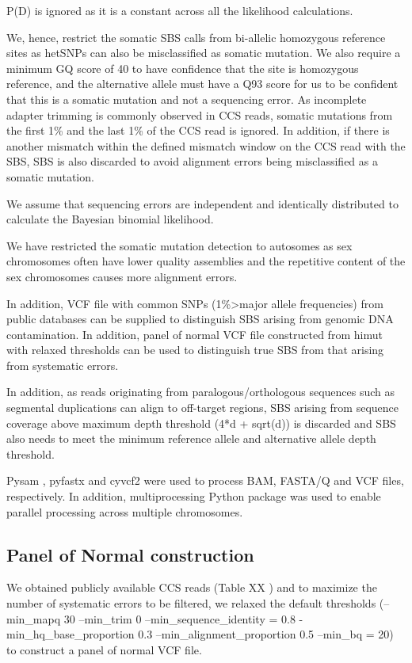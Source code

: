 P(D) is ignored as it is a constant across all the likelihood calculations. 

We, hence, restrict the somatic SBS calls from bi-allelic homozygous reference sites as hetSNPs can also be misclassified as somatic mutation. We also require a minimum GQ score of 40 to have confidence that the site is homozygous reference, and the alternative allele must have a Q93 score for us to be confident that this is a somatic mutation and not a sequencing error. As incomplete adapter trimming is commonly observed in CCS reads, somatic mutations from the first 1\% and the last 1\% of the CCS read is ignored. In addition, if there is another mismatch within the defined mismatch window on the CCS read with the SBS, SBS is also discarded to avoid alignment errors being misclassified as a somatic mutation. 

We assume that sequencing errors are independent and identically distributed to calculate the Bayesian binomial likelihood. 

We have restricted the somatic mutation detection to autosomes as sex chromosomes often have lower quality assemblies and the repetitive content of the sex chromosomes causes more alignment errors. 

In addition, VCF file with common SNPs (1\%>major allele frequencies) from public databases can be supplied to distinguish SBS arising from genomic DNA contamination. In addition, panel of normal VCF file constructed from himut with relaxed thresholds can be used to distinguish true SBS from that arising from systematic errors.  

In addition, as reads originating from paralogous/orthologous sequences such as segmental duplications can align to off-target regions, SBS arising from sequence coverage above maximum depth threshold (4*d + sqrt(d)) is discarded and SBS also needs to meet the minimum reference allele and alternative allele depth threshold. 

Pysam \cite{}, pyfastx \cite{Du2021-ya} and cyvcf2 \cite{Pedersen2017-ld} were used to process BAM, FASTA/Q and VCF files, respectively. In addition, multiprocessing \cite{} Python package was used to enable parallel processing across multiple chromosomes. 

\subsection{Panel of Normal construction}

We obtained publicly available CCS reads (Table XX ) and to maximize the number of systematic errors to be filtered, we relaxed the default thresholds (--min\_mapq 30 --min\_trim 0 --min\_sequence\_identity = 0.8 -min\_hq\_base\_proportion 0.3 --min\_alignment\_proportion 0.5 --min\_bq = 20) to construct a panel of normal VCF file. 

